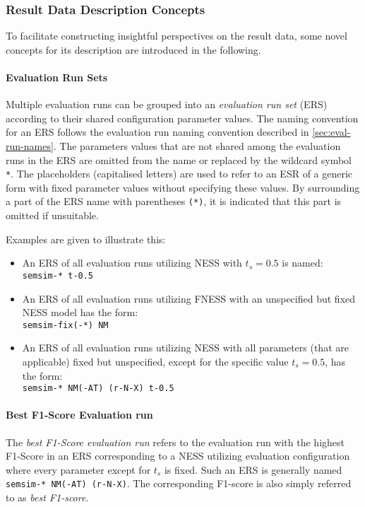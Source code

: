 \documentclass[11pt]{scrreprt}
\begin{document}
\subsubsection{Result Data Description Concepts}
To facilitate constructing insightful perspectives on the result data, some novel concepts for its description are introduced in the following.

\paragraph{Evaluation Run Sets}
Multiple evaluation runs can be grouped into an \textit{evaluation run set} (ERS) according to their shared configuration parameter values. The naming convention for an ERS follows the evaluation run naming convention described in \cref{sec:eval-run-names}. The parameters values that are not shared among the evaluation runs in the ERS are omitted from the name or replaced by the wildcard symbol \texttt{*}. The placeholders (capitalised letters) are used to refer to an ESR of a generic form with fixed parameter values without specifying these values.  By surrounding a part of the ERS name with parentheses \texttt{(*)}, it is indicated that this part is omitted if unsuitable. 

Examples are given to illustrate this:
\begin{itemize}
	\item An ERS of all evaluation runs utilizing NESS with \(t_s = 0.5\) is named: \\ \texttt{semsim-* t-0.5}
	\item An ERS of all evaluation runs utilizing FNESS with an unspecified but fixed NESS model has the form: \\ \texttt{semsim-fix(-*) NM} 
	\item An ERS of all evaluation runs utilizing NESS with all parameters (that are applicable) fixed but unspecified, except for the specific value \(t_s = 0.5\), has the form: \\ \texttt{semsim-* NM(-AT) (r-N-X) t-0.5}
\end{itemize}

\paragraph{Best F1-Score Evaluation run} The \textit{best F1-Score evaluation run} refers to the evaluation run with the highest F1-Score in an ERS corresponding to a NESS utilizing evaluation configuration where every parameter except for \(t_s\) is fixed. Such an ERS is generally named \texttt{semsim-* NM(-AT) (r-N-X)}. The corresponding F1-score is also simply referred to as \textit{best F1-score}.
\end{document}
